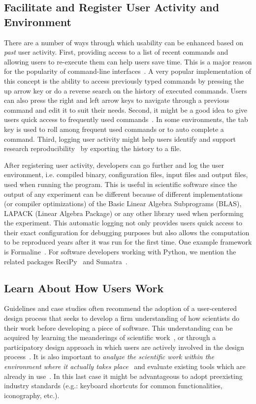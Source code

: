 \documentclass[conference]{IEEEtran}
\begin{document}
\subsection{Facilitate and Register User Activity and Environment}
There are a number of ways through which usability can be enhanced based on \emph{past} user activity.
First, providing access to a list of recent commands and allowing
users to re-execute them can help users save time.
This is a major reason for the popularity of command-line interfaces~\cite{bestprSC}.
A very popular implementation of this concept is the ability to access previously typed
commands by pressing the up arrow key or do a reverse search on the history of executed commands.
Users can also press the right and left arrow keys to navigate through a previous command
and edit it to suit their needs.
Second, it might be a good idea to give users quick access
to frequently used commands~\cite{Julvez:2014}.
In some environments, the tab key is used to roll among frequent used commands
or to auto complete a command.
Third, logging user activity
might help users identify and support research reproducibility~\cite{List:2017}
by exporting the history to a file.

After registering user activity,
developers can go further and log the user environment,
i.e. compiled binary, configuration files, input files and output files,
used when running the program.
This is useful in scientific software since the output of any experiment can be different because of different implementations (or compiler optimizations) of
the Basic Linear Algebra Subprograms (BLAS), LAPACK (Linear Algebra Package) or
any other library used when performing the experiment.
This automatic logging not only provides users
quick access to their exact configuration for debugging purposes
but also allows the computation to be reproduced years after it was run for the first time.
One example framework is Formaline~\cite{formaline}.
For software developers working with Python, we
mention the related packages ReciPy~\cite{ReciPy} and Sumatra~\cite{sumatra2014}.

\subsection{Learn About How Users Work}

Guidelines and case studies often recommend the adoption of a user-centered 
design process that seeks to develop a firm understanding of how scientists do 
their work before developing a piece of software.
This understanding can be acquired by learning the meanderings of scientific work~\cite{Springmeyer:1993}, 
or through a participatory design approach in which users are actively involved in 
the design process~\cite{Letondal:2004,Aragon:2008, Thomer:2016,  Luna2017204}.
It is also important to \emph{analyze the scientific work within the 
environment where it actually takes place}~\cite{Pancake:1996} and evaluate 
existing tools which are already in use~\cite{Javahery:2004}. In this last case
it might be advantageous to adopt preexisting industry standards (e.g.: keyboard
shortcuts for common functionalities, iconography, etc.).  
\end{document}
